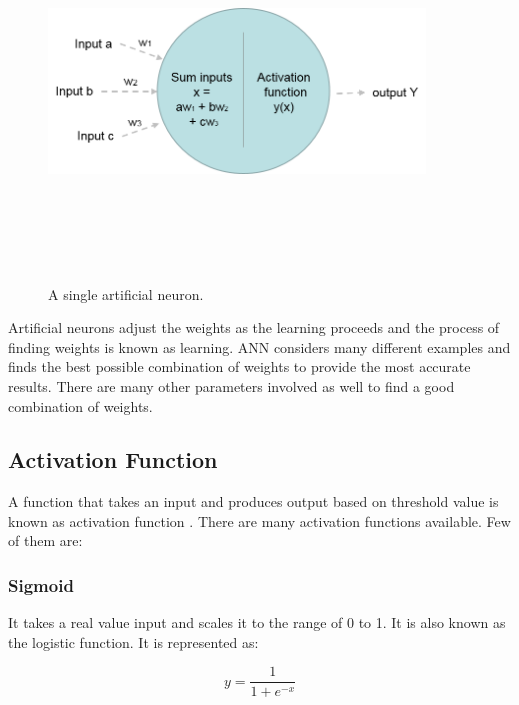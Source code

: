 \begin{figure}[htpb]
	\centering
	\includegraphics[width=10cm,height=10cm,keepaspectratio=true]{images/single-neuron}
	\caption{
		A single artificial neuron.
	}
	\label{fig:single-neuron}
\end{figure}

Artificial neurons adjust the weights as the learning proceeds and the process of finding weights is known as learning. ANN considers many different examples and finds the best possible combination of weights to provide the most accurate results. There are many other parameters involved as well to find a good combination of weights.

\subsection{Activation Function}

A function that takes an input and produces output based on threshold value is known as activation function \cite{ujjwalkarn}. There are many activation functions available. Few of them are:

\subsubsection{Sigmoid}
It takes a real value input and scales it to the range of 0 to 1. It is also known as the logistic function. It is represented as:

\begin{equation} 
y = \frac{1}{1 + e^{-x}}
\end{equation}

